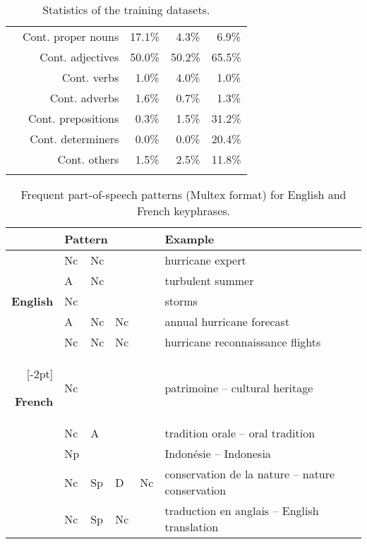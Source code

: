 \begin{table}[h]
\begin{tabular}{@{~}r@{~}r@{~}c@{~}c@{~}c@{~}}
        & Cont. proper nouns & 17.1\% & $~~$4.3\% & $~~$6.9\%\\
        & Cont. adjectives & 50.0\% & 50.2\% & 65.5\%\\
        & Cont. verbs & $~~$1.0\% & $~~$4.0\% & $~~$1.0\%\\
        & Cont. adverbs & $~~$1.6\% & $~~$0.7\% & $~~$1.3\%\\
        & Cont. prepositions & $~~$0.3\% & $~~$1.5\% & 31.2\%\\
        & Cont. determiners & $~~$0.0\% & $~~$0.0\% & 20.4\%\\
        & Cont. others & $~~$1.5\% & $~~$2.5\% & 11.8\%\\
        \addlinespace[.5\defaultaddspace]
        \bottomrule
      \end{tabular}
      \caption{Statistics of the training datasets.
               \label{tab:train_dataset_statistics}}
    \end{table}

    \begin{table*}
      \centering
      \begin{tabular}{rlllll}
        \toprule
        & \multicolumn{4}{l}{\textbf{Pattern}} & \textbf{Example}\\
        \midrule
        \multirow{5}{*}[-2pt]{\begin{sideways}\textbf{English}\end{sideways}} & Nc & Nc & & & hurricane expert\\ %
        & A & Nc & & & turbulent summer\\ %
        & Nc & & & & storms\\ %
        & A & Nc & Nc & & annual hurricane forecast\\ %
        & Nc & Nc & Nc & & hurricane reconnaissance flights\\ %
        \addlinespace[1.5\defaultaddspace]
        \multirow{5}{*}[-2pt]{\begin{sideways}\textbf{French}\end{sideways}} & Nc & & & & patrimoine -- cultural heritage\\ %
        & Nc & A & & & tradition orale -- oral tradition\\ %
        & Np & & & & Indonésie -- Indonesia\\ %
        & Nc & Sp & D & Nc & conservation de la nature -- nature conservation\\ %
        & Nc & Sp & Nc & & traduction en anglais -- English translation\\ %
        \bottomrule
      \end{tabular}
      \caption{Frequent part-of-speech patterns (Multex format) for English and
               French keyphrases. \label{tab:best_patterns}}
    \end{table*}

